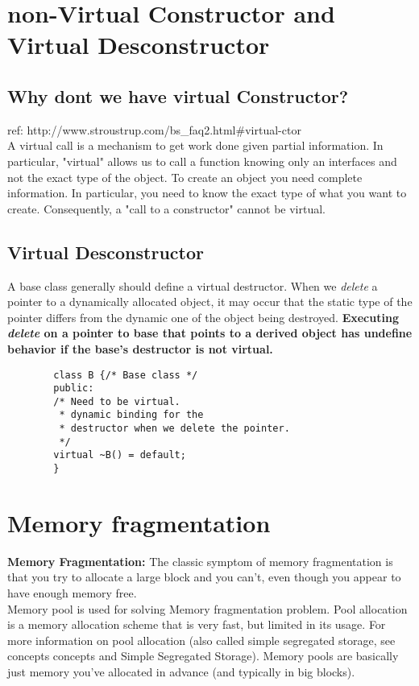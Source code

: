 \documentclass[11pt,a4paper]{article}
\begin{document}
    \section{non-Virtual Constructor and Virtual Desconstructor}
    \subsection{Why dont we have virtual Constructor?}
    \textsf{ref: http://www.stroustrup.com/bs\_faq2.html\#virtual-ctor}\\
    A virtual call is a mechanism to get work done given partial information. In particular, "virtual" allows us to call a function knowing only an interfaces and not the exact type of the object. To create an object you need complete information. In particular, you need to know the exact type of what you want to create. Consequently, a "call to a constructor" cannot be virtual.
    \subsection{Virtual Desconstructor} 
    A base class generally should define a virtual destructor. When we \textit{delete} a pointer to a dynamically allocated object, it may occur that the static type of the pointer differs from the dynamic one of the object being destroyed. \textbf{Executing \textit{delete} on a pointer to base that points to a derived object
    has undefine behavior if the base's destructor is not virtual.}
    \begin{tcolorbox}
    \begin{lstlisting} 
        class B {/* Base class */
        public: 
        /* Need to be virtual.
         * dynamic binding for the
         * destructor when we delete the pointer.
         */
        virtual ~B() = default;
        }
    \end{lstlisting}
    \end{tcolorbox}
    \section{Memory fragmentation} 
    \textbf{Memory Fragmentation: }The classic symptom of memory fragmentation is that you try to allocate a large block and you can't, even though you appear to have enough memory free.\\
    Memory pool is used for solving Memory fragmentation problem. Pool allocation is a memory allocation scheme that is very fast, but limited in its usage. For more information on pool allocation (also called simple segregated storage, see concepts concepts and Simple Segregated Storage). Memory pools are basically just memory you've allocated in advance (and typically in big blocks). 
\end{document}
